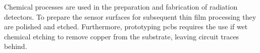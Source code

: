 \documentclass[../../main.tex]{subfiles}
\begin{document}
%
    \Xsection%
    Chemical processes are used in the preparation and fabrication of radiation detectors.
    To prepare the sensor surfaces for subsequent thin film processing they are polished and etched.
    Furthermore, prototyping \glspl{pcb} requires the use if wet chemical etching to remove copper from the substrate, leaving circuit traces behind.
\end{document}
